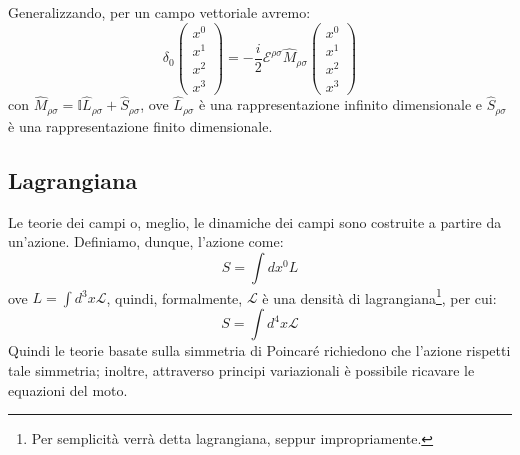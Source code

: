 Generalizzando, per un campo vettoriale avremo:
\begin{equation}
\delta_0
    \begin{pmatrix}
x^0   \\
x^1   \\
x^2  \\
x^3 
\end{pmatrix}
=   - \dfrac{i}{2}\mathcal{E}^{\rho\sigma}\hat{M}_{\rho\sigma}\begin{pmatrix}
x^0   \\
x^1   \\
x^2  \\
x^3 
\end{pmatrix}
\end{equation}
con $\hat{M}_{\rho\sigma}=\mathds{I}\hat{L}_{\rho\sigma}+\hat{S}_{\rho\sigma}$, ove $\hat{L}_{\rho\sigma}$ è una rappresentazione infinito dimensionale e $\hat{S}_{\rho\sigma}$ è una rappresentazione finito dimensionale.

\subsection{Lagrangiana}
Le teorie dei campi o, meglio, le dinamiche dei campi sono costruite a partire da un'azione. Definiamo, dunque, l'azione come:
\begin{equation}
    S=\int dx^0 L
\end{equation}
ove $L=\int d^3x\mathcal{L}$, quindi, formalmente, $\mathcal{L}$ è una densità di lagrangiana\footnote{Per semplicità verrà detta lagrangiana, seppur impropriamente.}, per cui:
\begin{equation}
    S=\int d^4x\mathcal{L}
\end{equation}
Quindi le teorie basate sulla simmetria di Poincaré richiedono che l'azione rispetti tale simmetria; inoltre, attraverso principi variazionali è possibile ricavare le equazioni del moto.

